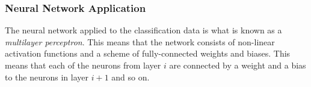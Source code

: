         \subsubsection{Neural Network Application}
            The neural network applied to the classification data is what is known as a \textit{multilayer perceptron}. This means that the network consists of non-linear activation functions and a scheme of fully-connected weights and biases. This means that each of the neurons from layer $i$ are connected by a weight and a bias to the neurons in layer $i+1$ and so on.
      
      
